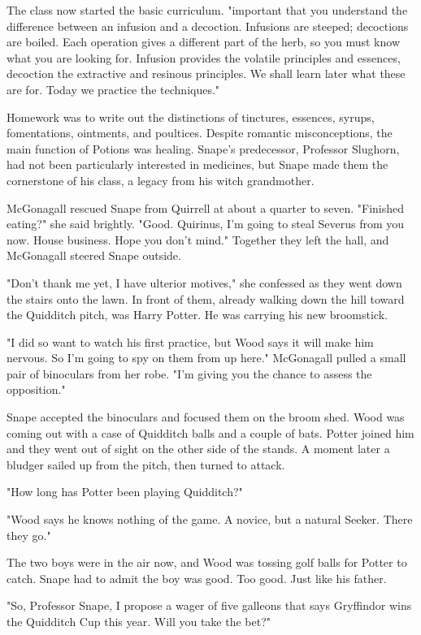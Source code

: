 The class now started the basic curriculum. "{\el}important that you understand the difference between an infusion and a decoction. Infusions are steeped; decoctions are boiled. Each operation gives a different part of the herb, so you must know what you are looking for. Infusion provides the volatile principles and essences, decoction the extractive and resinous principles. We shall learn later what these are for. Today we practice the techniques."

Homework was to write out the distinctions of tinctures, essences, syrups, fomentations, ointments, and poultices. Despite romantic misconceptions, the main function of Potions was healing. Snape's predecessor, Professor Slughorn, had not been particularly interested in medicines, but Snape made them the cornerstone of his class, a legacy from his witch grandmother.

McGonagall rescued Snape from Quirrell at about a quarter to seven. "Finished eating?" she said brightly. "Good. Quirinus, I'm going to steal Severus from you now. House business. Hope you don't mind." Together they left the hall, and McGonagall steered Snape outside.

"Don't thank me yet, I have ulterior motives," she confessed as they went down the stairs onto the lawn. In front of them, already walking down the hill toward the Quidditch pitch, was Harry Potter. He was carrying his new broomstick.

"I did so want to watch his first practice, but Wood says it will make him nervous. So I'm going to spy on them from up here." McGonagall pulled a small pair of binoculars from her robe. "I'm giving you the chance to assess the opposition."

Snape accepted the binoculars and focused them on the broom shed. Wood was coming out with a case of Quidditch balls and a couple of bats. Potter joined him and they went out of sight on the other side of the stands. A moment later a bludger sailed up from the pitch, then turned to attack.

"How long has Potter been playing Quidditch?"

"Wood says he knows nothing of the game. A novice, but a natural Seeker. There they go."

The two boys were in the air now, and Wood was tossing golf balls for Potter to catch. Snape had to admit the boy was good. Too good. Just like his father.

"So, Professor Snape, I propose a wager of five galleons that says Gryffindor wins the Quidditch Cup this year. Will you take the bet?"

